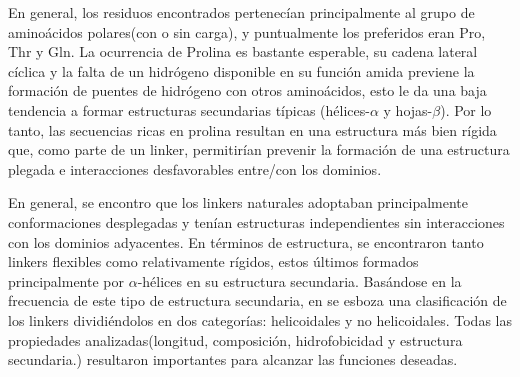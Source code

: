 En general, los residuos encontrados pertenecían principalmente al grupo de aminoácidos polares(con o sin carga), 
y puntualmente los preferidos eran Pro, Thr y Gln.
La ocurrencia de Prolina es bastante esperable, su cadena lateral cíclica y la falta de un hidrógeno disponible 
en su función amida previene la formación de puentes de hidrógeno con otros aminoácidos, esto le da una baja 
tendencia a formar estructuras secundarias típicas (hélices-$\alpha$ y hojas-$\beta$).
Por lo tanto, las secuencias ricas en prolina resultan en una estructura más bien rígida que, como parte de un linker, permitirían 
prevenir la formación de una estructura plegada e interacciones desfavorables entre/con los dominios. 





En general, se encontro que los linkers naturales adoptaban principalmente conformaciones desplegadas y tenían estructuras independientes sin interacciones con los dominios adyacentes.
En términos de estructura, se encontraron tanto linkers flexibles como relativamente rígidos, estos últimos formados principalmente por $\alpha$-hélices en su estructura secundaria. 
Basándose en la frecuencia de este tipo de estructura secundaria, en \cite{george2002analysis} se esboza una clasificación de los linkers dividiéndolos en dos categorías: helicoidales y no helicoidales.
Todas las propiedades analizadas(longitud, composición, hidrofobicidad y estructura secundaria.) resultaron importantes para alcanzar las funciones deseadas.



